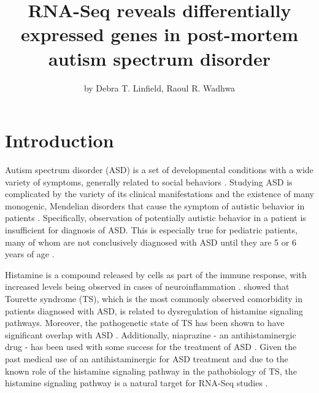 \title{RNA-Seq reveals differentially expressed genes in post-mortem autism
spectrum disorder}
\author{by Debra T. Linfield, Raoul R. Wadhwa}

\maketitle


\section{Introduction}\label{introduction}

Autism spectrum disorder (ASD) is a set of developmental conditions with
a wide variety of symptoms, generally related to social behaviors
\citep{brentani2013}. Studying ASD is complicated by the variety of its
clinical manifestations and the existence of many monogenic, Mendelian
disorders that cause the symptom of autistic behavior in patients
\citep{ivanov2015}. Specifically, observation of potentially autistic
behavior in a patient is insufficient for diagnosis of ASD. This is
especially true for pediatric patients, many of whom are not
conclusively diagnosed with ASD until they are 5 or 6 years of age
\citep{ellerbeck2015}.

Histamine is a compound released by cells as part of the immune
response, with increased levels being observed in cases of
neuroinflammation \citep{jutel2005}. \citet{fernandez2012} showed that
Tourette syndrome (TS), which is the most commonly observed comorbidity
in patients diagnosed with ASD, is related to dysregulation of histamine
signaling pathways. Moreover, the pathogenetic state of TS has been
shown to have significant overlap with ASD \citep{clarke2012}.
Additionally, niaprazine - an antihistaminergic drug - has been used
with some success for the treatment of ASD \citep{rossi1999}. Given the
past medical use of an antihistaminergic for ASD treatment and due to
the known role of the histamine signaling pathway in the pathobiology of
TS, the histamine signaling pathway is a natural target for RNA-Seq
studies \citep{orig-paper}.

